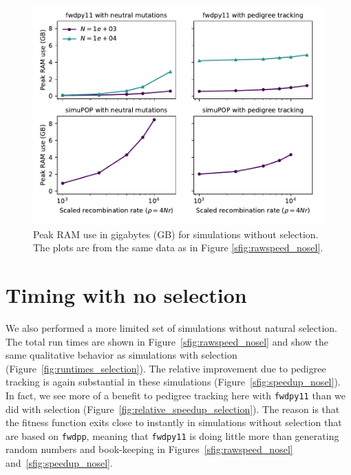 \documentclass{article}
\newcommand{\fwdpp}{\texttt{fwdpp}}
\newcommand{\fwdpy}{\texttt{fwdpy11}}
\begin{document}
\begin{figure}
    \includegraphics[]{sims/memuse_nosel}
    \caption{\label{sfig:ramnosel}Peak RAM use in gigabytes (GB) for simulations without selection.  The plots are from
    the same data as in Figure \ref{sfig:rawspeed_nosel}.}
\end{figure}

\section{Timing with no selection}
\label{ss:timing_nosel}
\renewcommand{\thefigure}{C\arabic{figure}}
\setcounter{figure}{0}

We also performed a more limited set of simulations without natural selection.  The total run times are shown in
Figure~\ref{sfig:rawspeed_nosel} and show the same qualitative behavior as simulations with selection
(Figure~\ref{fig:runtimes_selection}).  The relative improvement due to pedigree tracking is again substantial in these
simulations (Figure~\ref{sfig:speedup_nosel}).  In fact, we see more of a benefit to pedigree tracking here with \fwdpy{}
than we did with selection (Figure~\ref{fig:relative_speedup_selection}).  The reason is that the fitness function exits
close to instantly in simulations without selection that are based on \fwdpp{}, meaning that \fwdpy{} is doing little
more than generating random numbers and book-keeping in Figures~\ref{sfig:rawspeed_nosel}
and~\ref{sfig:speedup_nosel}.
\end{document}
